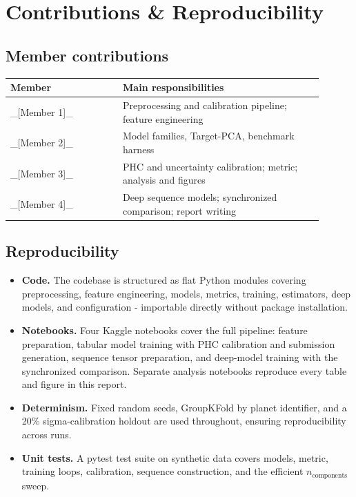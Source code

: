 \documentclass[12pt]{article}
\begin{document}
\section{Contributions \& Reproducibility}

\subsection{Member contributions}

\begin{center}\small
\begin{tabular}{@{}p{0.32\linewidth} p{0.58\linewidth}@{}}
\toprule
Member & Main responsibilities \\
\midrule
\_[Member 1]\_ & Preprocessing and calibration pipeline; feature engineering \\
\_[Member 2]\_ & Model families, Target-PCA, benchmark harness \\
\_[Member 3]\_ & PHC and uncertainty calibration; metric; analysis and figures \\
\_[Member 4]\_ & Deep sequence models; synchronized comparison; report writing \\
\bottomrule
\end{tabular}
\end{center}

\subsection{Reproducibility}

\begin{itemize}
\item \textbf{Code.} The codebase is structured as flat Python modules \cite{pedregosa2011} covering preprocessing, feature engineering, models, metrics, training, estimators, deep models, and configuration - importable directly without package installation.
\item \textbf{Notebooks.} Four Kaggle notebooks cover the full pipeline: feature preparation, tabular model training with PHC calibration and submission generation, sequence tensor preparation, and deep-model training with the synchronized comparison. Separate analysis notebooks reproduce every table and figure in this report.
\item \textbf{Determinism.} Fixed random seeds, GroupKFold by planet identifier, and a 20\% sigma-calibration holdout are used throughout, ensuring reproducibility across runs.
\item \textbf{Unit tests.} A pytest test suite on synthetic data covers models, metric, training loops, calibration, sequence construction, and the efficient $n_{\text{components}}$ sweep.
\end{itemize}
\end{document}
